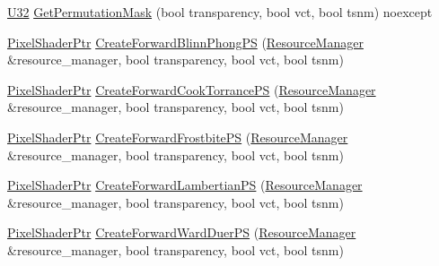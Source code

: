 \begin{DoxyCompactItemize}
\item 
\mbox{\hyperlink{namespacemage_aa5d6eaabaac3cdd01873d6a3d27e90f3}{U32}} \mbox{\hyperlink{namespacemage_1_1rendering_1_1anonymous__namespace_02shader__factory__forward_8cpp_03_a56555da6c6f92ea3239083ac75a77d9a}{Get\+Permutation\+Mask}} (bool transparency, bool vct, bool tsnm) noexcept
\item 
\mbox{\hyperlink{namespacemage_1_1rendering_af03d922b228ee9c8542baaa2ecc9f259}{Pixel\+Shader\+Ptr}} \mbox{\hyperlink{namespacemage_1_1rendering_1_1anonymous__namespace_02shader__factory__forward_8cpp_03_a2381624b5b7f34a6c489f385c4dac6f6}{Create\+Forward\+Blinn\+Phong\+PS}} (\mbox{\hyperlink{classmage_1_1rendering_1_1_resource_manager}{Resource\+Manager}} \&resource\+\_\+manager, bool transparency, bool vct, bool tsnm)
\item 
\mbox{\hyperlink{namespacemage_1_1rendering_af03d922b228ee9c8542baaa2ecc9f259}{Pixel\+Shader\+Ptr}} \mbox{\hyperlink{namespacemage_1_1rendering_1_1anonymous__namespace_02shader__factory__forward_8cpp_03_a52a0ab44b576a680b505c648c14c7edd}{Create\+Forward\+Cook\+Torrance\+PS}} (\mbox{\hyperlink{classmage_1_1rendering_1_1_resource_manager}{Resource\+Manager}} \&resource\+\_\+manager, bool transparency, bool vct, bool tsnm)
\item 
\mbox{\hyperlink{namespacemage_1_1rendering_af03d922b228ee9c8542baaa2ecc9f259}{Pixel\+Shader\+Ptr}} \mbox{\hyperlink{namespacemage_1_1rendering_1_1anonymous__namespace_02shader__factory__forward_8cpp_03_ae2e4146ea74cc5301a470cc0e3b82d23}{Create\+Forward\+Frostbite\+PS}} (\mbox{\hyperlink{classmage_1_1rendering_1_1_resource_manager}{Resource\+Manager}} \&resource\+\_\+manager, bool transparency, bool vct, bool tsnm)
\item 
\mbox{\hyperlink{namespacemage_1_1rendering_af03d922b228ee9c8542baaa2ecc9f259}{Pixel\+Shader\+Ptr}} \mbox{\hyperlink{namespacemage_1_1rendering_1_1anonymous__namespace_02shader__factory__forward_8cpp_03_a24bf750b201b5d310ecb7c7c736d6999}{Create\+Forward\+Lambertian\+PS}} (\mbox{\hyperlink{classmage_1_1rendering_1_1_resource_manager}{Resource\+Manager}} \&resource\+\_\+manager, bool transparency, bool vct, bool tsnm)
\item 
\mbox{\hyperlink{namespacemage_1_1rendering_af03d922b228ee9c8542baaa2ecc9f259}{Pixel\+Shader\+Ptr}} \mbox{\hyperlink{namespacemage_1_1rendering_1_1anonymous__namespace_02shader__factory__forward_8cpp_03_aca96e3d8dbb2485f742c118b29b7e932}{Create\+Forward\+Ward\+Duer\+PS}} (\mbox{\hyperlink{classmage_1_1rendering_1_1_resource_manager}{Resource\+Manager}} \&resource\+\_\+manager, bool transparency, bool vct, bool tsnm)
\end{DoxyCompactItemize}


